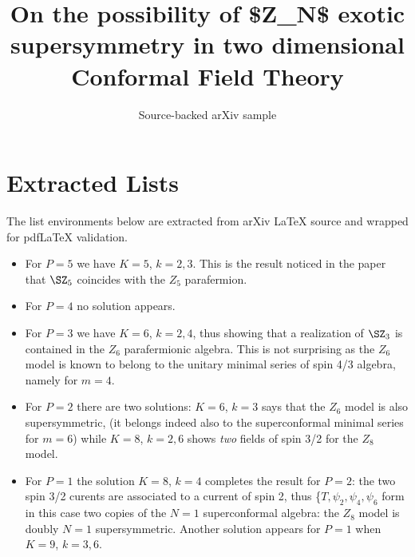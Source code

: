 \documentclass[11pt]{article}
\title{On the possibility of \$Z\_N\$ exotic supersymmetry in two dimensional
  Conformal Field Theory}
\author{Source-backed arXiv sample}
\date{}
\begin{document}
\maketitle
\section{Extracted Lists}

The list environments below are extracted from arXiv LaTeX source and wrapped for pdfLaTeX validation.

\begin{itemize}
\item
For $P=5$ we have $K=5$, $k=2,3$. This is the result noticed in the paper
that $\SZ_5$ coincides with the $Z_5$ parafermion.
\item
For $P=4$ no solution appears.
\item
For $P=3$ we have $K=6$, $k=2,4$, thus showing that a realization of $\SZ_3$
is contained in the $Z_6$ parafermionic algebra. This is not surprising as
the $Z_6$ model is known to belong to the unitary minimal series of spin 4/3
algebra, namely for $m=4$.
\item
For $P=2$ there are two solutions: $K=6$, $k=3$ says that the $Z_6$ model is
also supersymmetric, (it belongs indeed also to the superconformal minimal
series for $m=6$) while $K=8$, $k=2,6$ shows {\em two} fields of spin 3/2
for the $Z_8$ model.
\item
For $P=1$ the solution $K=8$, $k=4$ completes the result for $P=2$: the two
spin 3/2 curents are associated to a current of spin 2, thus \{$T,\psi_2,
\psi_4,\psi_6$ form in this case two copies of the $N=1$ superconformal
algebra: the $Z_8$ model is doubly $N=1$ supersymmetric. Another solution
appears for $P=1$ when $K=9$, $k=3,6$.
\end{itemize}
\end{document}
